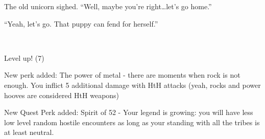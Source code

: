 The old unicorn sighed. ``Well, maybe you're right\dots let's go home.''

``Yeah, let's go. That puppy can fend for herself.''

\clearpage

~\vfill

\begin{engnote}
    Level up! (7)
    
    New perk added: The power of metal - there are moments when rock is not enough. You inflict 5 additional damage with HtH attacks (yeah, rocks and power hooves are considered HtH weapons)
    
    New Quest Perk added: Spirit of 52 - Your legend is growing: you will have less low level random hostile encounters as long as your standing with all the tribes is at least neutral.
\end{engnote}



